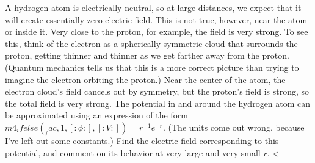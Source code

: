 A hydrogen atom is electrically neutral, so at large distances, we expect that
        it will create essentially zero electric field. This is not true, however, near
        the atom or inside it. Very close to the proton, for example, the field
        is very strong. To see this, think of the electron as a spherically
        symmetric cloud that surrounds the
        proton, getting thinner and thinner as we get farther away from the proton. (Quantum
        mechanics tells us that this is a more correct picture than trying to imagine the
        electron orbiting the proton.)  Near the center of the atom, the electron cloud's
        field cancels out by symmetry, but the proton's field is strong, so the total field
        is very strong. The potential in and around the hydrogen atom can be approximated using
        an expression of the form $m4_ifelse(__fac,1,[:\phi:],[:V:])=r^{-1}e^{-r}$. (The units come out wrong, because I've
        left out some constants.) Find the electric field corresponding to this potential, and
        comment on its behavior at very large and very small $r$.
        <%
